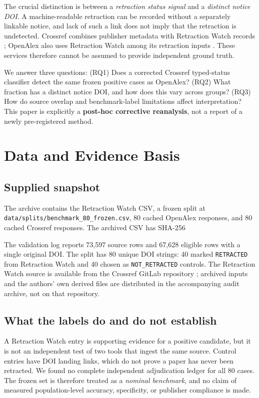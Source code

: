 \documentclass[10pt,a4paper,twocolumn]{article}
\begin{document}
The crucial distinction is between a \emph{retraction status signal} and a \emph{distinct notice DOI}. A machine-readable retraction can be recorded without a separately linkable notice, and lack of such a link does not imply that the retraction is undetected. Crossref combines publisher metadata with Retraction Watch records \cite{crossref2025integration,crossrefdocs}; OpenAlex also uses Retraction Watch among its retraction inputs \cite{openalexdocs}. These services therefore cannot be assumed to provide independent ground truth.

We answer three questions: (RQ1) Does a corrected Crossref typed-status classifier detect the same frozen positive cases as OpenAlex? (RQ2) What fraction has a distinct notice DOI, and how does this vary across groups? (RQ3) How do source overlap and benchmark-label limitations affect interpretation? This paper is explicitly a \textbf{post-hoc corrective reanalysis}, not a report of a newly pre-registered method.

\section{Data and Evidence Basis}
\subsection{Supplied snapshot}
The archive contains the Retraction Watch CSV, a frozen split at \texttt{data/splits/benchmark\_80\_frozen.csv}, 80 cached OpenAlex responses, and 80 cached Crossref responses. The archived CSV has SHA-256\par{}\par\noindent The validation log reports 73,597 source rows and 67,628 eligible rows with a single original DOI. The split has 80 unique DOI strings: 40 marked \texttt{RETRACTED} from Retraction Watch and 40 chosen as \texttt{NOT\_RETRACTED} controls. The Retraction Watch source is available from the Crossref GitLab repository \cite{rwgitlab}; archived inputs and the authors' own derived files are distributed in the accompanying audit archive, not on that repository.

\subsection{What the labels do and do not establish}
A Retraction Watch entry is supporting evidence for a positive candidate, but it is not an independent test of two tools that ingest the same source. Control entries have DOI landing links, which do not prove a paper has never been retracted. We found no complete independent adjudication ledger for all 80 cases. The frozen set is therefore treated as a \emph{nominal benchmark}, and no claim of measured population-level accuracy, specificity, or publisher compliance is made.
\end{document}
